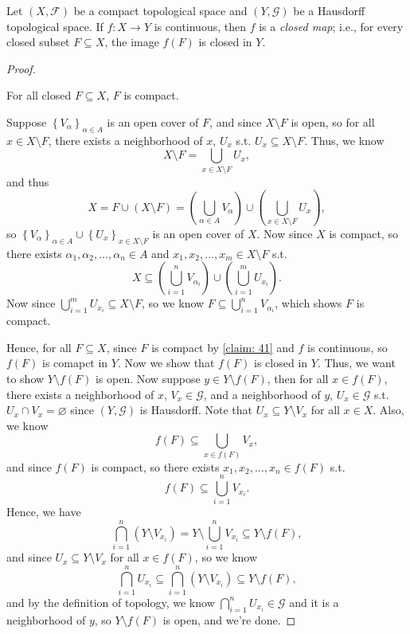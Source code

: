 \begin{problem}[15pts]
    Let $(X,\mathcal{F})$ be a compact topological space and $(Y,\mathcal{G})$ be a Hausdorff topological space. 
If $f:X\to Y$ is continuous, then $f$ is a \emph{closed map}; i.e., for every closed
subset $F\subseteq X$, the image $f(F)$ is closed in $Y$.
\end{problem}
\begin{proof}
  \begin{claim} \label{claim: 41}
    For all closed \(F \subseteq X\), \(F\) is compact.  
  \end{claim}
  \begin{explanation}
    Suppose \(\left\{ V_\alpha  \right\}_{\alpha \in A} \) is an open cover of \(F\), and since \(X \setminus F\) is open, so for all \(x \in X \setminus F\), there exists a neighborhood of \(x\), \(U_x\) s.t. \(U_x \subseteq X \setminus F\). Thus, we know 
    \[
      X \setminus F = \bigcup_{x \in X \setminus F} U_x,
    \] and thus 
    \[
      X = F \cup (X \setminus F) = \left( \bigcup_{\alpha \in A} V_\alpha   \right) \cup \left( \bigcup_{x \in X \setminus F} U_x  \right), 
    \] so \(\left\{ V_\alpha  \right\}_{\alpha \in A} \cup \left\{ U_x \right\}_{x \in X \setminus F}  \) is an open cover of \(X\). Now since \(X\) is compact, so there exists \(\alpha _1, \alpha _2, \dots , \alpha _n \in A\) and \(x_1, x_2, \dots , x_m \in X \setminus F\) s.t. 
    \[
      X \subseteq \left( \bigcup_{i=1}^{n} V_{\alpha _i}  \right) \cup \left( \bigcup_{i=1}^{m} U_{x_i} \right).  
    \]  
    Now since \(\bigcup_{i=1}^{m} U_{x_i} \subseteq X \setminus F \), so we know \(F \subseteq \bigcup_{i=1}^{n} V_{\alpha _i} \), which shows \(F\) is compact.   
  \end{explanation}
  Hence, for all \(F \subseteq X\), since \(F\) is compact by \autoref{claim: 41} and \(f\) is continuous, so \(f(F)\) is comapct in \(Y\). Now we show that \(f(F)\) is closed in \(Y\). Thus, we want to show \(Y \setminus f(F)\) is open. Now suppose \(y \in Y \setminus f(F)\), then for all \(x \in f(F)\), there exists a neighborhood of \(x\), \(V_x \in \mathcal{G} \), and a neighborhood of \(y\), \(U_x \in \mathcal{G} \) s.t. \(U_x \cap V_x = \varnothing \) since \((Y, \mathcal{G} )\) is Hausdorff. Note that \(U_x \subseteq Y \setminus V_x\) for all \(x \in X\). Also, we know 
  \[
    f(F) \subseteq  \bigcup_{x \in f(F)} V_x, 
  \] and since \(f(F)\) is compact, so there exists \(x_1, x_2, \dots , x_n \in f(F)\) s.t. 
  \[
    f(F) \subseteq \bigcup_{i=1}^{n} V_{x_i}. 
  \] Hence, we have 
  \[
    \bigcap_{i=1}^{n} (Y \setminus V_{x_i}) = Y \setminus \bigcup_{i=1}^{n} V_{x_i} \subseteq Y \setminus f(F),  
  \] and since \(U_x \subseteq Y \setminus V_x\) for all \(x \in f(F)\), so we know 
  \[
    \bigcap_{i=1}^{n} U_{x_i} \subseteq \bigcap_{i=1}^{n} \left( Y \setminus V_{x_i} \right) \subseteq Y \setminus f(F), 
  \] and by the definition of topology, we know \(\bigcap _{i = 1}^n U_{x_i} \in \mathcal{G} \) and it is a neighborhood of \(y\), so \(Y \setminus f(F)\) is open, and we're done.   

\end{proof}

